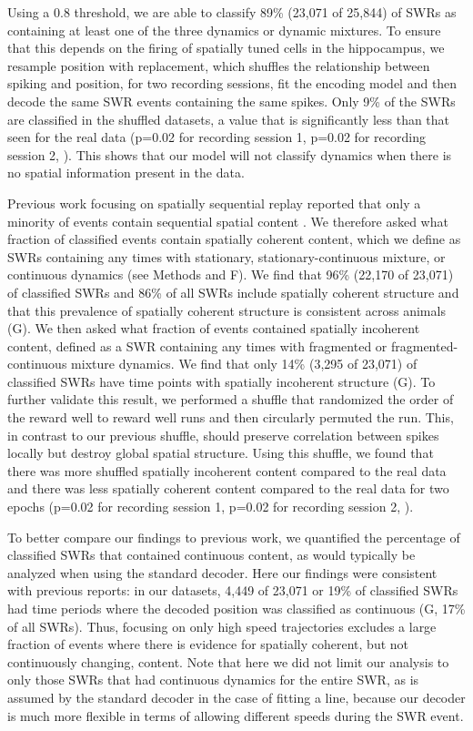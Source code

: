 \documentclass[9pt,lineno]{elife}
\begin{document}
Using a 0.8 threshold, we are able to classify 89\% (23,071 of 25,844) of SWRs as containing at least one of the three dynamics or dynamic mixtures. To ensure that this depends on the firing of spatially tuned cells in the hippocampus, we resample position with replacement, which shuffles the relationship between spiking and position, for two recording sessions, fit the encoding model and then decode the same SWR events containing the same spikes. Only 9\% of the SWRs are classified in the shuffled datasets, a value that is significantly less than that seen for the real data (p=0.02 for recording session 1, p=0.02 for recording session 2, ). This shows that our model will not classify dynamics when there is no spatial information present in the data.

Previous work focusing on spatially sequential replay reported that only a minority of events contain sequential spatial content \citep{KarlssonAwakereplayremote2009, FosterReversereplaybehavioural2006, DavidsonHippocampalReplayExtended2009}. We therefore asked what fraction of classified events contain spatially coherent content, which we define as SWRs containing any times with stationary, stationary-continuous mixture, or continuous dynamics (see Methods and F). We find that 96\% (22,170 of 23,071) of classified SWRs and 86\% of all SWRs include spatially coherent structure and that this prevalence of spatially coherent structure is consistent across animals (G). We then asked what fraction of events contained spatially incoherent content, defined as a SWR containing any times with fragmented or fragmented-continuous mixture dynamics. We find that only 14\% (3,295 of 23,071) of classified SWRs have time points with spatially incoherent structure (G). To further validate this result, we performed a shuffle that randomized the order of the reward well to reward well runs and then circularly permuted the run. This, in contrast to our previous shuffle, should preserve correlation between spikes locally but destroy global spatial structure. Using this shuffle, we found that there was more shuffled spatially incoherent content compared to the real data and there was less spatially coherent content compared to the real data for two epochs (p=0.02 for recording session 1, p=0.02 for recording session 2, ).

To better compare our findings to previous work, we quantified the percentage of classified SWRs that contained continuous content, as would typically be analyzed when using the standard decoder. Here our findings were consistent with previous reports: in our datasets, 4,449 of 23,071 or 19\% of classified SWRs had time periods where the decoded position was classified as continuous (G, 17\% of all SWRs). Thus, focusing on only high speed trajectories excludes a large fraction of events where there is evidence for spatially coherent, but not continuously changing, content. Note that here we did not limit our analysis to only those SWRs that had continuous dynamics for the entire SWR, as is assumed by the standard decoder in the case of fitting a line, because our decoder is much more flexible in terms of allowing different speeds during the SWR event.
\end{document}
